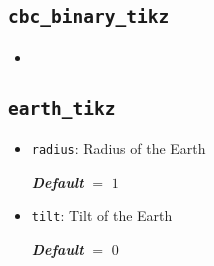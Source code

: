 \documentclass[
    DIV=11,
    BCOR=0mm,
    paper=a4,
    fontsize=11pt,
    twoside=false,
    titlepage=true
]{scrartcl}
\newcommand{\code}[1]{\textcolor{codecolor}{\texttt{#1}}}
\newcommand{\defaultval}[1]{%
    {\bfseries\slshape%
    Default} $=$ #1%
}
\begin{document}
        \subsection{\texttt{cbc\_binary\_tikz}}
\begin{itemize}
    \item 
\end{itemize}



        \subsection{\texttt{earth\_tikz}}
\begin{itemize}
    \item \code{radius}: Radius of the Earth
    
    \defaultval{$1$}


    \item \code{tilt}: Tilt of the Earth
    
    \defaultval{$0$}
\end{itemize}
\end{document}
